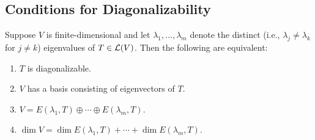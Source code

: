 \subsection{Conditions for Diagonalizability}
\setcounter{thm}{54}
\begin{thm} 
  \label{thm: conditions equivalent to diagonalizability}
  Suppose $V$ is finite-dimensional and let $\lambda_1, \dots,\lambda_m$ denote the distinct (i.e., $\lambda_j \neq \lambda_k$ for $j \neq k$) eigenvalues of $T\in \mathcal{L} (V)$. Then the following are equivalent:
  \begin{enumerate}[label=\textbf{(\alph*)}]
    \item $T$ is diagonalizable.
    \item $V$ has a basis consisting of eigenvectors of $T$.
    \item $V=E(\lambda_1, T) \oplus \cdots \oplus E(\lambda_m, T).$
    \item $\dim V = \dim E(\lambda_1, T) + \cdots + \dim E(\lambda_m, T)$.
  \end{enumerate}
\end{thm}
